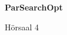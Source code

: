 \documentclass[a4paper]{article}
\begin{document}
\printGenericVSLHeader
\begin{center}
\begin{vsltext}{3cm}{4cm}

   \vspace{0.5cm} 

    \textbf{ParSearchOpt} 

    \vspace{1.5cm}

   Hörsaal 4 

\end{vsltext}

\end{center}
\end{document}

